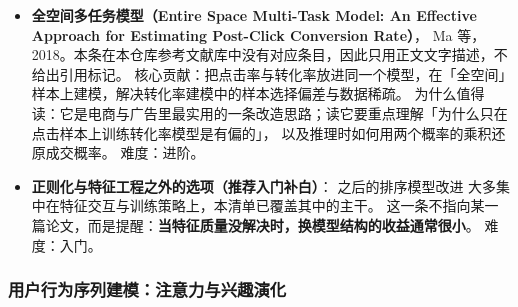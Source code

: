 \begin{itemize}
        为什么值得读：它是理解「推荐模型为什么是内存带宽瓶颈而非算力瓶颈」的最佳入门材料。
        难度：进阶。
  \item \textbf{全空间多任务模型（Entire Space Multi-Task Model: An Effective Approach for Estimating Post-Click Conversion Rate）}，
        Ma 等，2018。本条在本仓库参考文献库中没有对应条目，因此只用正文文字描述，不给出引用标记。
        核心贡献：把点击率与转化率放进同一个模型，在「全空间」样本上建模，解决转化率建模中的样本选择偏差与数据稀疏。
        为什么值得读：它是电商与广告里最实用的一条改造思路；读它要重点理解「为什么只在点击样本上训练转化率模型是有偏的」，
        以及推理时如何用两个概率的乘积还原成交概率。
        难度：进阶。
  \item \textbf{正则化与特征工程之外的选项（推荐入门补白）}：\cite{wang2021dcn} 之后的排序模型改进
        大多集中在特征交互与训练策略上，本清单已覆盖其中的主干。
        这一条不指向某一篇论文，而是提醒：\textbf{当特征质量没解决时，换模型结构的收益通常很小}。
        难度：入门。
\end{itemize}

\subsubsection{用户行为序列建模：注意力与兴趣演化}

